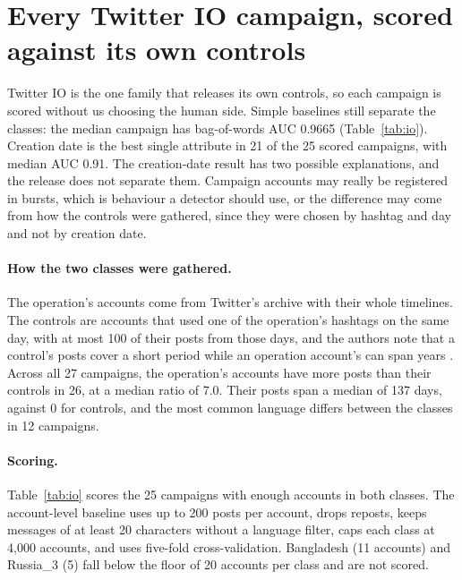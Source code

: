 \documentclass[10pt,a4paper]{article}
\begin{document}
\section{Every Twitter IO campaign, scored against its own controls}\label{app:io}
Twitter IO is the one family that releases its own controls, so each campaign is scored without
  us choosing the human side.
Simple baselines still separate the classes: the median campaign has bag-of-words AUC 0.9665
  (Table~\ref{tab:io}).
Creation date is the best single attribute in 21 of the 25 scored campaigns, with median AUC 0.91.
The creation-date result has two possible explanations, and the release does not separate them.
Campaign accounts may really be registered in bursts, which is behaviour a detector should
  use, or the difference may come from how the controls were gathered, since they were chosen by
  hashtag and day and not by creation date.

\paragraph{How the two classes were gathered.}
The operation's accounts come from Twitter's archive with their whole timelines.
The controls are accounts that used one of the operation's hashtags on the same day, with at most
  100 of their posts from those days, and the authors note that a control's posts cover a short
  period while an operation account's can span years \citep{seckin2024labeled}.
Across all 27 campaigns, the operation's accounts have more posts than their controls in 26,
  at a median ratio of 7.0.
Their posts span a median of 137 days, against 0 for controls, and the most common language
  differs between the classes in 12 campaigns.

\paragraph{Scoring.}
Table~\ref{tab:io} scores the 25 campaigns with enough accounts in both classes.
The account-level baseline uses up to 200 posts per account, drops reposts, keeps messages of
  at least 20 characters without a language filter, caps each class at 4,000 accounts, and uses
  five-fold cross-validation.
Bangladesh (11 accounts) and Russia\_3 (5) fall below the floor of 20 accounts per class and
  are not scored.
\end{document}
